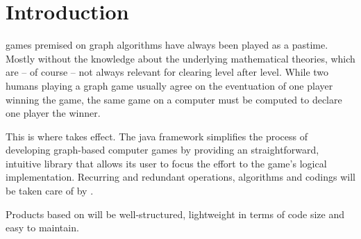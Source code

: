 \section{Introduction}
\Glspl{game} premised on \gls{graph} \glspl{algorithm} have always been played as a pastime. Mostly without the knowledge about the underlying mathematical theories, which are – of course – not always relevant for clearing \gls{level} after level. While two humans playing a graph game usually agree on the eventuation of one player winning the game, the same game on a computer must be computed to declare one \gls{player} the winner.\par

This is where {\graphioli} takes effect. The \Gls{java} \gls{framework} simplifies the process of developing graph-based computer games by providing an straightforward, intuitive \gls{library} that allows its user to focus the effort to the game's logical implementation. Recurring and redundant operations, algorithms and codings will be taken care of by {\graphioli}.\par

Products based on {\graphioli} will be well-structured, lightweight in terms of code size and easy to maintain.\par

